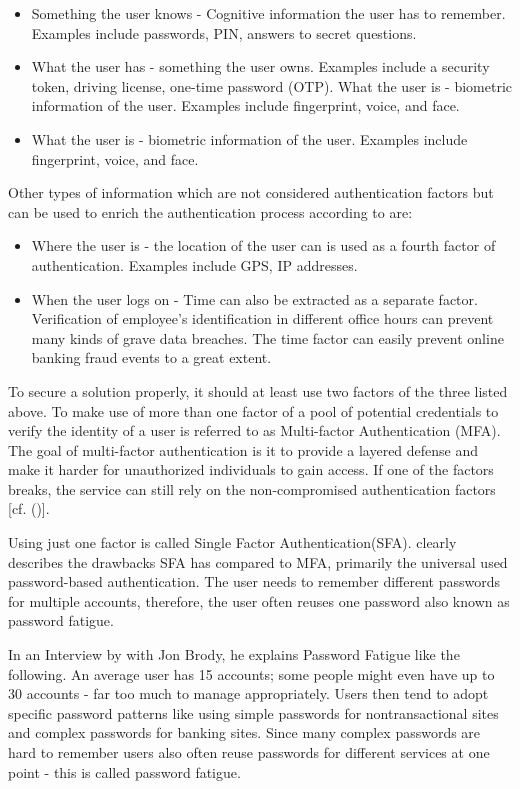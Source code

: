 \begin{itemize}  
\item Something the user knows - Cognitive information the user has to remember. Examples include passwords, PIN, answers to secret questions.
\item What the user has - something the user owns. Examples include a security token, driving license, one-time password (OTP). 
What the user is - biometric information of the user. Examples include fingerprint, voice, and face.  
\item What the user is - biometric information of the user. Examples include fingerprint, voice, and face. 
\end{itemize}

 Other types of information which are not considered authentication factors but  can be used to enrich the authentication process according to \citet{Dasgupta:2017:AUA} are:
 
 \begin{itemize}
 	\item Where the user is - the location of the user can is used as a fourth factor of authentication. Examples include GPS, IP addresses.
 	\item When the user logs on - Time can also be extracted as a separate factor. Verification of employee’s identification in different office hours can prevent many kinds of grave data breaches. The time factor can easily prevent online banking fraud events to a great extent. 
 \end{itemize}

To secure a solution properly, it should at least use two factors of the three listed above. To make use of more than one factor of a pool of potential credentials to verify the identity of a user is referred to as Multi-factor Authentication (MFA). The goal of multi-factor authentication is it to provide a layered defense and make it harder for unauthorized individuals to gain access. If one of the factors breaks, the service can still rely on the non-compromised authentication factors [cf. (\citet{Dasgupta:2017:AUA})].

Using just one factor is called Single Factor Authentication(SFA). \cite{Dasgupta:2017:AUA} clearly describes the drawbacks SFA has compared to MFA, primarily the universal used password-based authentication. The user needs to remember different passwords for multiple accounts, therefore, the user often reuses one password also known as password fatigue.

In an Interview by \cite{Tomkins:2009:DPF} with Jon Brody, he explains Password Fatigue like the following. An average user has 15 accounts; some people might even have up to 30 accounts - far too much to manage appropriately. Users then tend to adopt specific password patterns like using simple passwords for nontransactional sites and complex passwords for banking sites. Since many complex passwords are hard to remember users also often reuse passwords for different services at one point - this is called password fatigue. 

